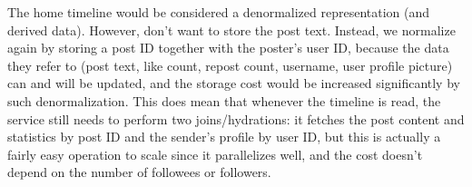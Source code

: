 \documentclass[table, xcdraw]{article}%
\begin{document}
The home timeline would be considered a denormalized representation (and derived data). However, don't want to store the post text. Instead, we normalize again by storing a post ID together with the poster's user ID, because the data they refer to (post text, like count, repost count, username, user profile picture) can and will be updated, and the storage cost would be increased significantly by such denormalization. This does mean that whenever the timeline is read, the service still needs to perform two joins/hydrations: it fetches the post content and statistics by post ID and the sender’s profile by user ID, but this is actually a fairly easy operation to scale since it parallelizes well, and the cost doesn’t depend on the number of followees or followers.
\end{document}
